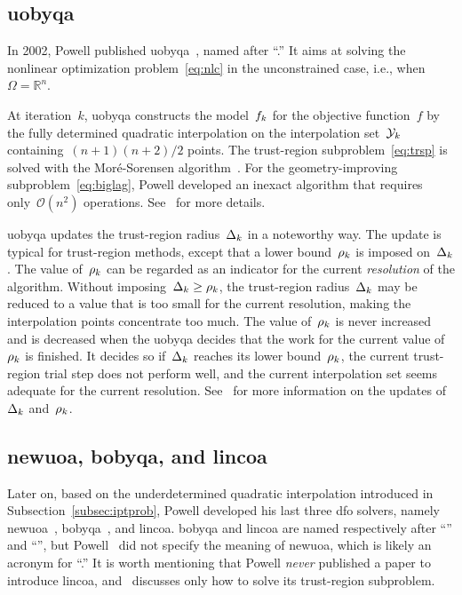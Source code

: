 \documentclass[manuscript,screen,review]{acmart}
\numberwithin{equation}{section}
\newcommand*{\R}{\mathbb{R}}
\newcommand*{\fset}{\Omega}
\newcommand*{\objm}[1][k]{\obj\ifthenelse{\equal{#1}{}}{}{_{#1}}}
\newcommand*{\obj}{f}
\newcommand*{\radlb}[1][k]{\rho\ifthenelse{\equal{#1}{}}{}{_{#1}}}
\newcommand*{\rad}[1][k]{\Delta\ifthenelse{\equal{#1}{}}{}{_{#1}}}
\newcommand*{\xpt}[1][k]{\mathcal{Y}\ifthenelse{\equal{#1}{}}{}{_{#1}}}
\begin{document}
\subsection{\gls{uobyqa}}
\label{subsec:uobyqa}

In 2002, Powell published \gls{uobyqa}~\cite{Powell_2002}, named after ``.''
It aims at solving the nonlinear optimization problem~\eqref{eq:nlc} in the unconstrained case, i.e., when~$\fset = \R^n$.

At iteration~$k$, \gls{uobyqa} constructs the model~$\objm$ for the objective function~$\obj$ by the fully determined quadratic interpolation on the interpolation set~$\xpt$ containing~$(n + 1)(n + 2) / 2$ points.
The trust-region subproblem~\eqref{eq:trsp} is solved with the Mor{\'{e}}-Sorensen algorithm~\cite{More_Sorensen_1983}.
For the geometry-improving subproblem~\eqref{eq:biglag}, Powell developed an inexact algorithm that requires only~$\mathcal{O}(n^2)$ operations.
See~\cite[\S~2]{Powell_2002} for more details.

\Gls{uobyqa} updates the trust-region radius~$\rad$ in a noteworthy way.
The update is typical for trust-region methods, except that a lower bound~$\radlb$ is imposed on~$\rad$.
The value of~$\radlb[k]$ can be regarded as an indicator for the current \emph{resolution} of the algorithm.
Without imposing~$\rad[k] \ge \radlb[k]$, the trust-region radius~$\rad[k]$ may be reduced to a value that is too small for the current resolution, making the interpolation points concentrate too much.
The value of~$\radlb[k]$ is never increased and is decreased when the \gls{uobyqa} decides that the work for the current value of~$\radlb[k]$ is finished.
It decides so if~$\rad[k]$ reaches its lower bound~$\radlb[k]$, the current trust-region trial step does not perform well, and the current interpolation set seems adequate for the current resolution.
See~\cite[\S~3]{Powell_2002} for more information on the updates of~$\rad$ and~$\radlb[k]$.

\subsection{\gls{newuoa}, \gls{bobyqa}, and \gls{lincoa}}
\label{subsec:nbloa}

Later on, based on the underdetermined quadratic interpolation introduced in Subsection~\ref{subsec:iptprob},
Powell developed his last three \gls{dfo} solvers, namely \gls{newuoa}~\cite{Powell_2006,Powell_2008}, \gls{bobyqa}~\cite{Powell_2009}, and \gls{lincoa}.
\Gls{bobyqa} and \gls{lincoa} are named respectively after ``'' and ``'', but Powell~\cite{Powell_2006,Powell_2008} did not specify the meaning of \gls{newuoa}, which is likely an acronym for ``.''
It is worth mentioning that Powell \emph{never} published a paper to introduce \gls{lincoa}, and~\cite{Powell_2015} discusses only how to solve its trust-region subproblem.
\end{document}
